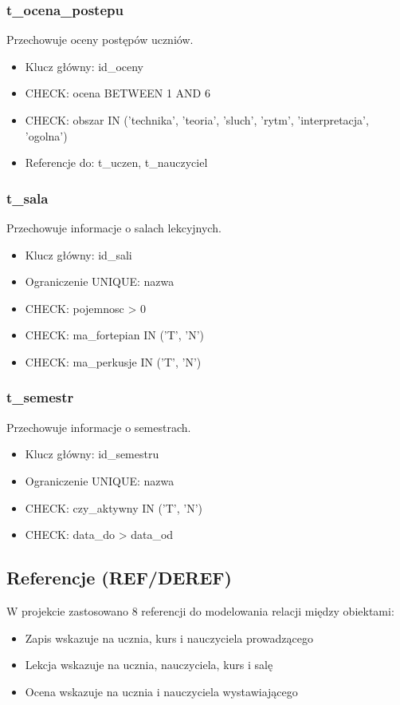 \documentclass[12pt,a4paper]{article}
\begin{document}
\subsubsection{t\_ocena\_postepu}
Przechowuje oceny postępów uczniów.
\begin{itemize}[nosep]
    \item Klucz główny: id\_oceny
    \item CHECK: ocena BETWEEN 1 AND 6
    \item CHECK: obszar IN ('technika', 'teoria', 'sluch', 'rytm', 'interpretacja', 'ogolna')
    \item Referencje do: t\_uczen, t\_nauczyciel
\end{itemize}

\subsubsection{t\_sala}
Przechowuje informacje o salach lekcyjnych.
\begin{itemize}[nosep]
    \item Klucz główny: id\_sali
    \item Ograniczenie UNIQUE: nazwa
    \item CHECK: pojemnosc > 0
    \item CHECK: ma\_fortepian IN ('T', 'N')
    \item CHECK: ma\_perkusje IN ('T', 'N')
\end{itemize}

\subsubsection{t\_semestr}
Przechowuje informacje o semestrach.
\begin{itemize}[nosep]
    \item Klucz główny: id\_semestru
    \item Ograniczenie UNIQUE: nazwa
    \item CHECK: czy\_aktywny IN ('T', 'N')
    \item CHECK: data\_do > data\_od
\end{itemize}

\subsection{Referencje (REF/DEREF)}
W projekcie zastosowano 8 referencji do modelowania relacji między obiektami:
\begin{itemize}[nosep]
    \item Zapis wskazuje na ucznia, kurs i nauczyciela prowadzącego
    \item Lekcja wskazuje na ucznia, nauczyciela, kurs i salę
    \item Ocena wskazuje na ucznia i nauczyciela wystawiającego
\end{itemize}
\end{document}
